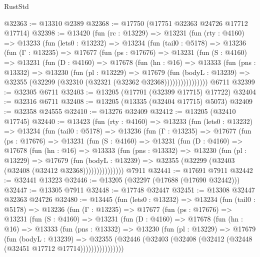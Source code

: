 \begin{lexlean}{RustStd}
\begin{coremodule}
@32363 := @13310 @2389
@32368 := @17750 (@17751 @32363 @24726 @17712 @17714)
@32398 := @13420
    (fun (rc : @13229) =>
    @13231
      (fun (rty : @4160) =>
      @13233
        (fun (lets0 : @13232) =>
        @13234
          (fun (tail0 : @5178) =>
          @13236
            (fun (Γ : @13235) =>
            @17677
              (fun (ps : @17676) =>
              @13231
                (fun (S : @4160) =>
                @13231
                  (fun (D : @4160) =>
                  @17678
                    (fun (hn : @16) =>
                    @13333
                      (fun (pns : @13332) =>
                      @13230
                        (fun (pl : @13229) =>
                        @17679
                          (fun (bodyL : @13239) =>
                          @32355 (@32299 (@32310 (@32321 (@32362 @32368))))))))))))))))
    @6711
@32399 := @32305 @6711
@32403 := @13205 (@17701 (@32399 @17715) @17722)
@32404 := @32316 @6711
@32408 := @13205 (@13335 (@32404 @17715) @5073)
@32409 := @32358 @24555
@32410 := @13276 @32409
@32412 := @13205 (@32410 @17745)
@32440 := @13423
    (fun (rty : @4160) =>
    @13233
      (fun (lets0 : @13232) =>
      @13234
        (fun (tail0 : @5178) =>
        @13236
          (fun (Γ : @13235) =>
          @17677
            (fun (ps : @17676) =>
            @13231
              (fun (S : @4160) =>
              @13231
                (fun (D : @4160) =>
                @17678
                  (fun (hn : @16) =>
                  @13333
                    (fun (pns : @13332) =>
                    @13230
                      (fun (pl : @13229) =>
                      @17679
                        (fun (bodyL : @13239) =>
                        @32355 (@32299 (@32403 (@32408 (@32412 @32368)))))))))))))))
    @7911
@32441 := @17691 @7911
@32442 := @32441 @13223
@32446 := @13205 (@32297 (@17688 (@17690 @32442)))
@32447 := @13305 @7911
@32448 := @17748 @32447
@32451 := @13308 @32447 @32363 @24726
@32480 := @13445
    (fun (lets0 : @13232) =>
    @13234
      (fun (tail0 : @5178) =>
      @13236
        (fun (Γ : @13235) =>
        @17677
          (fun (ps : @17676) =>
          @13231
            (fun (S : @4160) =>
            @13231
              (fun (D : @4160) =>
              @17678
                (fun (hn : @16) =>
                @13333
                  (fun (pns : @13332) =>
                  @13230
                    (fun (pl : @13229) =>
                    @17679
                      (fun (bodyL : @13239) =>
                      @32355
                        (@32446
                          (@32403 (@32408 (@32412 (@32448 (@32451 @17712 @17714))))))))))))))))

\end{coremodule}
\end{lexlean}
